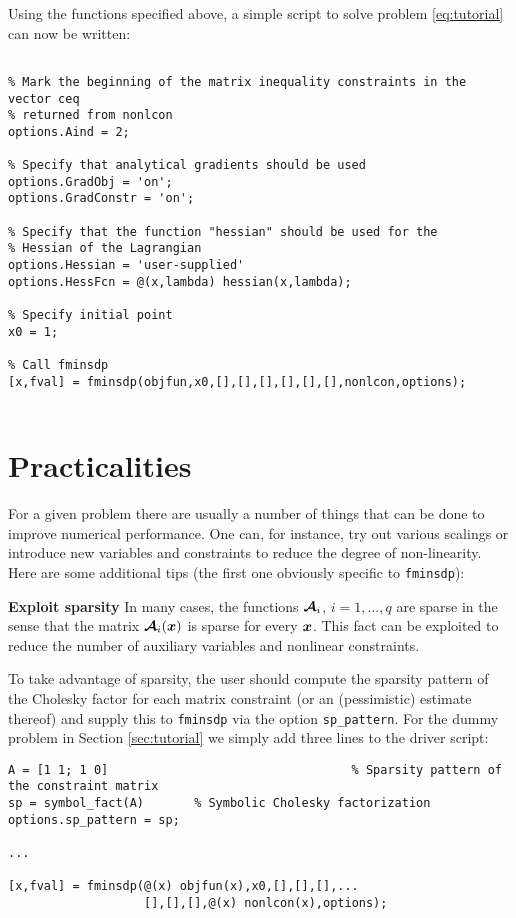 \documentclass{article}
\newcommand{\bm}[1]{\mbox{\boldmath $#1$}}
\begin{document}
Using the functions specified above, a simple script to solve problem \eqref{eq:tutorial} can now be written:

\begin{verbatim}

% Mark the beginning of the matrix inequality constraints in the vector ceq 
% returned from nonlcon
options.Aind = 2;

% Specify that analytical gradients should be used
options.GradObj = 'on';
options.GradConstr = 'on';

% Specify that the function "hessian" should be used for the
% Hessian of the Lagrangian
options.Hessian = 'user-supplied'
options.HessFcn = @(x,lambda) hessian(x,lambda);

% Specify initial point
x0 = 1;

% Call fminsdp
[x,fval] = fminsdp(objfun,x0,[],[],[],[],[],[],nonlcon,options);
				   
\end{verbatim}	





\section{Practicalities}
\label{sec:practicalities}

For a given problem there are usually a number of things that can be done to improve numerical performance. One can, for instance, try out various scalings or introduce new variables and constraints to reduce the degree of non-linearity. Here are some additional tips (the first one obviously specific to \texttt{fminsdp}): 

\vskip 5mm
\noindent\textbf{Exploit sparsity}
\vskip 2mm
\noindent In many cases, the functions $\bm{\mathcal{A}}_{i}$, $i = 1,...,q$ are sparse in the sense that the matrix $\bm{\mathcal{A}}_{i}(\bm{x})$
is sparse for every $\bm{x}$. This fact can be exploited to reduce the number of auxiliary variables and nonlinear constraints. 

To take advantage of sparsity, the user should compute the sparsity pattern of the Cholesky factor for each matrix constraint (or
an (pessimistic) estimate thereof) and supply this to \texttt{fminsdp} via the option \texttt{sp\_pattern}. For the
dummy problem in Section \ref{sec:tutorial} we simply add three lines to the driver script:
\begin{verbatim}
A = [1 1; 1 0]					  		        % Sparsity pattern of the constraint matrix
sp = symbol_fact(A)       % Symbolic Cholesky factorization
options.sp_pattern = sp;

...

[x,fval] = fminsdp(@(x) objfun(x),x0,[],[],[],...
				   [],[],[],@(x) nonlcon(x),options);

\end{verbatim}
\end{document}
